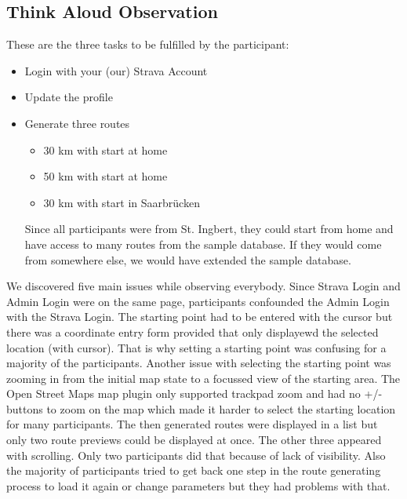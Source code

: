 \documentclass{sigchi}
\begin{document}
\subsection{Think Aloud Observation}
These are the three tasks to be fulfilled by the participant:
\begin{itemize}
\item Login with your (our) Strava Account
\item Update the profile
\item Generate three routes
\begin{itemize}
\item 30 km with start at home
\item 50 km with start at home
\item 30 km with start in Saarbrücken
\end{itemize}
Since all participants were from St. Ingbert, they could start from home and have access to many routes from the sample database. If they would come from somewhere else, we would have extended the sample database.
\end{itemize}
We discovered five main issues while observing everybody. Since Strava Login and Admin Login were on the same page, participants confounded the Admin Login with the Strava Login. 
The starting point had to be entered with the cursor but there was a coordinate entry form provided that only displayewd the selected location (with cursor). That is why setting a starting point was confusing for a majority of the participants. Another issue with selecting the starting point was zooming in from the initial map state to a focussed view of the starting area. The Open Street Maps map plugin only supported trackpad zoom and had no +/- buttons to zoom on the map which made it harder to select the starting location for many participants.
The then generated routes were displayed in a list but only two route previews could be displayed at once. The other three appeared with scrolling. Only two participants did that because of lack of visibility.
Also the majority of participants tried to get back one step in the route generating process to load it again or change parameters but they had problems with that.
\end{document}
